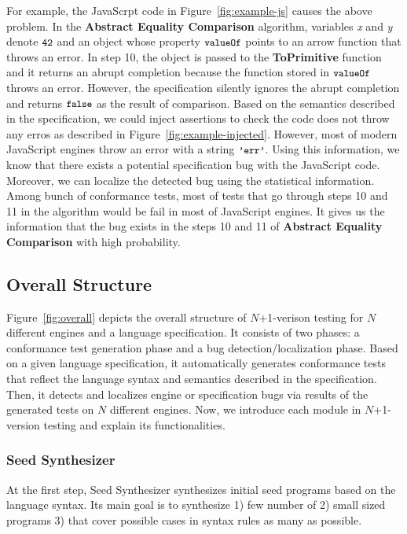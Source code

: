 For example, the JavaScrpt code in Figure~\ref{fig:example-js} causes the above
problem.  In the \textbf{Abstract Equality Comparison} algorithm, variables
\textit{x} and \textit{y} denote $\code{42}$ and an object whose property
$\code{valueOf}$ points to an arrow function that throws an error.  In step 10,
the object is passed to the \textbf{ToPrimitive} function and it returns an
abrupt completion because the function stored in $\code{valueOf}$ throws an
error.  However, the specification silently ignores the abrupt completion and
returns $\code{false}$ as the result of comparison.  Based on the semantics
described in the specification, we could inject assertions to check the code
does not throw any erros as described in Figure~\ref{fig:example-injected}.
However, most of modern JavaScript engines throw an error with a string
$\code{'err'}$.  Using this information, we know that there exists a potential
specification bug with the JavaScript code.  Moreover, we can localize the
detected bug using the statistical information. Among bunch of conformance
tests, most of tests that go through steps 10 and 11 in the algorithm would be
fail in most of JavaScript engines.  It gives us the information that the bug
exists in the steps 10 and 11 of \textbf{Abstract Equality Comparison} with high
probability.


\subsection{Overall Structure}

Figure~\ref{fig:overall} depicts the overall structure of $N$+1-verison testing
for $N$ different engines and a language specification.  It consists of two
phases: a conformance test generation phase and a bug detection/localization
phase.  Based on a given language specification, it automatically generates
conformance tests that reflect the language syntax and semantics described in
the specification.  Then, it detects and localizes engine or specification bugs
via results of the generated tests on $N$ different engines.  Now, we introduce
each module in $N$+1-version testing and explain its functionalities.
\newline

\subsubsection{Seed Synthesizer}
At the first step, \textsf{Seed Synthesizer} synthesizes initial seed programs
based on the language syntax.  Its main goal is to synthesize 1) few number of
2) small sized programs 3) that cover possible cases in syntax rules as many as
possible.
\newline

